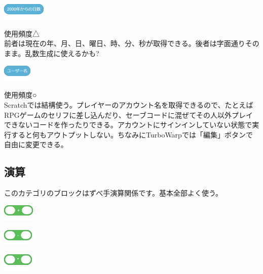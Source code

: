 \documentclass[b5paper,10pt]{jsarticle}
\begin{document}
\begin{multicols*}{3}
\begin{itembox}{12}
\includegraphics[height=8mm]{images/sensing_17.png}
\end{itembox}
使用頻度△\\
前者は現在の年、月、日、曜日、時、分、秒が取得できる。後者は字面通りそのまま。乱数生成に使えるかも?
\begin{itembox}{13}
\includegraphics[height=8mm]{images/sensing_18.png}
\end{itembox}
使用頻度○\\
Scratchでは結構使う。プレイヤーのアカウント名を取得できるので、たとえばRPGゲームのセリフに差し込んだり、セーブコードに混ぜてその人以外プレイできないコードを作ったりできる。アカウントにサインインしていない状態で実行すると何もアウトプットしない。ちなみにTurboWarpでは「編集」ボタンで自由に変更できる。

\subsection{演算}
このカテゴリのブロックはずべ手演算関係です。基本全部よく使う。
\begin{itembox}{1}
\includegraphics[height=8mm]{images/operators_1.png}

\includegraphics[height=8mm]{images/operators_2.png}

\includegraphics[height=8mm]{images/operators_3.png}


\end{itembox}
\end{multicols*}
\end{document}

